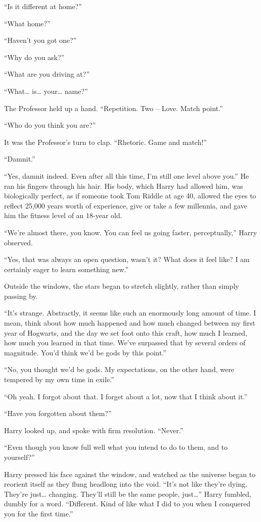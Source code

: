 “Is it different at home?”

“What home?”

“Haven’t you got one?”

“Why do you ask?”

“What are you driving at?”

“What… is… your… name?”

The Professor held up a hand. “Repetition.  Two – Love.  Match point.”

“Who do you think you are?”

It was the Professor’s turn to clap. “Rhetoric.  Game and match!”

“Damnit.”

“Yes, damnit indeed. Even after all this time, I’m still one level above you.” He ran his fingers through his hair. His body, which Harry had allowed him, was biologically perfect, as if someone took Tom Riddle at age 40, allowed the eyes to reflect 25,000 years worth of experience, give or take a few millennia, and gave him the fitness level of an 18-year old.

“We’re almost there, you know. You can feel us going faster, perceptually,” Harry observed.

“Yes, that was always an open question, wasn’t it? What does it feel like? I am certainly eager to learn something new.”

Outside the windows, the stars began to stretch slightly, rather than simply passing by.

“It’s strange. Abstractly, it seems like such an enormously long amount of time. I mean, think about how much happened and how much changed between my first year of Hogwarts, and the day we set foot onto this craft, how much I learned, how much you learned in that time. We’ve surpassed that by several orders of magnitude. You’d think we’d be gods by this point.”

“No, you thought we’d be gods. My expectations, on the other hand, were tempered by my own time in exile.”

“Oh yeah. I forgot about that. I forget about a lot, now that I think about it.”

“Have you forgotten about them?”

Harry looked up, and spoke with firm resolution. “Never.”

“Even though you know full well what you intend to do to them, and to yourself?”

Harry pressed his face against the window, and watched as the universe began to reorient itself as they flung headlong into the void. “It’s not like they’re dying. They’re just… changing. They’ll still be the same people, just…” Harry fumbled, dumbly for a word. “Different. Kind of like what I did to you when I conquered you for the first time.”

